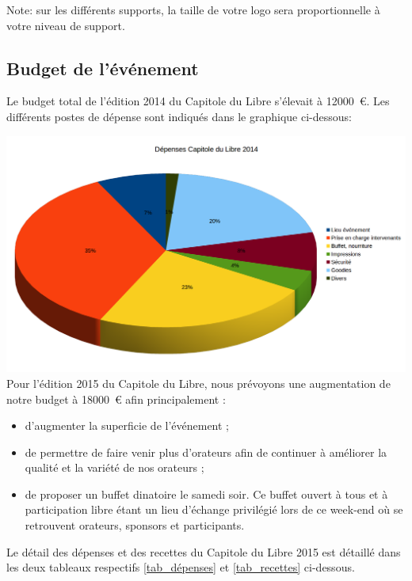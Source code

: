 Note: sur les différents supports, la taille de votre logo sera proportionnelle à votre niveau de support.

	\subsection{Budget de l’événement}

Le budget total de l'édition 2014 du Capitole du Libre s'élevait à \SI{12000}{€}. Les différents postes de dépense sont indiqués dans le graphique ci-dessous:

\includegraphics[scale=0.6]{Images/budget_2014.png}\\

Pour l'édition 2015 du Capitole du Libre, nous prévoyons une augmentation de notre budget à \SI{18000}{€} afin principalement :
\begin{itemize}[label=$\bullet$]
\item d'augmenter la superficie de l'événement ;
\item de permettre de faire venir plus d'orateurs afin de continuer à améliorer la qualité et la variété de nos orateurs ;
\item de proposer un buffet dinatoire le samedi soir. Ce buffet ouvert à tous et à participation libre étant un lieu d'échange privilégié lors de ce week-end où se retrouvent orateurs, sponsors et participants.
\end{itemize}

\Separateur

Le détail des dépenses et des recettes du Capitole du Libre 2015 est détaillé dans les deux tableaux respectifs \ref{tab_dépenses} et \ref{tab_recettes} ci-dessous.

